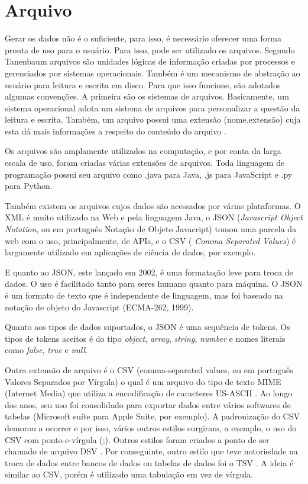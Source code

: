 \documentclass[
	12pt,				%
	openright,			%
	oneside,			%
	a4paper,			%
	english,			%
	brazil				%
	]{abntex2}
\begin{document}
	
	\section{Arquivo}
		Gerar os dados não é o suficiente, para isso, é necessário oferecer uma forma pronta de uso para o usuário.
		Para isso, pode ser utilizado os arquivos.
		Segundo Tanenbaum arquivos são unidades lógicas de informação criadas por processos e gerenciados por sistemas operacionais.
		Também é um mecanismo de abstração ao usuário para leitura e escrita em disco.
		Para que isso funcione, são adotados algumas convenções.
		A primeira são os sistemas de arquivos.
		Basicamente, um sistema operacional adota um sistema de arquivos para personalizar a questão da leitura e escrita.
		Também, um arquivo possui uma extensão (nome.extensão) cuja esta dá mais informações a respeito do conteúdo do arquivo \cite{tanenbaum1995sistemas}.
		\par
		Os arquivos são amplamente utilizados na computação, e por conta da larga escala de uso, foram criadas várias extensões de arquivos.
		Toda linguagem de programação possui seu arquivo como .java para Java, .js para JavaScript e .py para Python.
		\par
		Também existem os arquivos cujos dados são acessados por várias plataformas. O XML é muito utilizado na Web e pela linguagem Java, o JSON (\emph{Javascript Object Notation}, ou em português Notação de Objeto Javacript) tomou uma parcela da web com o uso, principalmente, de APIs, e o CSV ( \emph{Comma Separated Values}) é largamente utilizado em aplicações de ciência de dados, por exemplo.
        \par
		E quanto ao JSON, \cite{json-rfc-8259} \cite{json-jsonOrg} este lançado em 2002, é uma formatação leve para troca de dados. 
		O uso é facilitado tanto para seres humano quanto para máquina.
		O JSON é um formato de texto que é independente de linguagem, mas foi baseado na notação de objeto do Javascript (ECMA-262, 1999).
		\par
		Quanto aos tipos de dados suportados, o JSON \cite{json-rfc-8259} é uma sequência de tokens. 
		Os tipos de tokens aceitos é do tipo \textit{object}, \textit{array}, \textit{string}, \textit{number} e nomes literais como \textit{false}, \textit{true} e \textit{null}.
		\par
		Outra extensão de arquivo é o CSV \cite{csv-rfc-4180} (comma-separated values, ou em português Valores Separados por Vírgula) o qual é um arquivo do tipo de texto MIME (Internet Media) \cite{mime-rfc-2048} que utiliza a encodificação de caracteres US-ASCII \cite{csv-rfc-7111}.
		Ao longo dos anos, seu uso foi consolidado para exportar dados entre vários softwares de tabelas (Microsoft suíte para Apple Suíte, por exemplo).
		A padronização do CSV demorou a ocorrer e por isso, vários outros estilos surgiram, a exemplo, o uso do CSV com ponto-e-vírgula (;).
		Outros estilos foram criados a ponto de ser chamado de arquivo DSV \cite{dsv}.
		Por conseguinte, outro estilo que teve notoriedade na troca de dados entre bancos de dados ou tabelas de dados foi o TSV \cite{tsv-iana}.
		A ideia é similar ao CSV, porém é utilizado uma tabulação em vez de vírgula.
		
\end{document}
